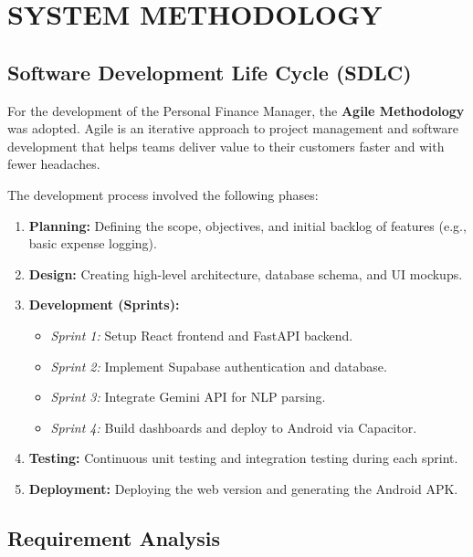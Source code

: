 \chapter{SYSTEM METHODOLOGY}

\section{Software Development Life Cycle (SDLC)}
For the development of the Personal Finance Manager, the \textbf{Agile Methodology} was adopted. Agile is an iterative approach to project management and software development that helps teams deliver value to their customers faster and with fewer headaches.

The development process involved the following phases:
\begin{enumerate}
    \item \textbf{Planning:} Defining the scope, objectives, and initial backlog of features (e.g., basic expense logging).
    \item \textbf{Design:} Creating high-level architecture, database schema, and UI mockups.
    \item \textbf{Development (Sprints):}
    \begin{itemize}
        \item \textit{Sprint 1:} Setup React frontend and FastAPI backend.
        \item \textit{Sprint 2:} Implement Supabase authentication and database.
        \item \textit{Sprint 3:} Integrate Gemini API for NLP parsing.
        \item \textit{Sprint 4:} Build dashboards and deploy to Android via Capacitor.
    \end{itemize}
    \item \textbf{Testing:} Continuous unit testing and integration testing during each sprint.
    \item \textbf{Deployment:} Deploying the web version and generating the Android APK.
\end{enumerate}

\section{Requirement Analysis}

